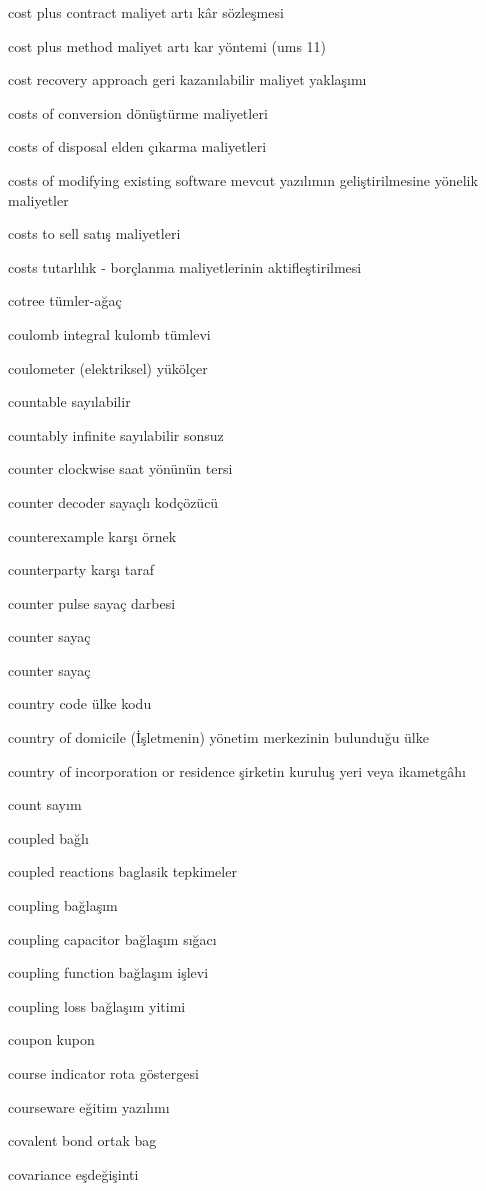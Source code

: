 \documentclass[12pt,fleqn]{article}\usepackage{../../common}
\begin{document}
cost plus contract maliyet artı kâr sözleşmesi

cost plus method maliyet artı kar yöntemi (ums 11)

cost recovery approach geri kazanılabilir maliyet yaklaşımı

costs of conversion dönüştürme maliyetleri

costs of disposal elden çıkarma maliyetleri

costs of modifying existing software mevcut yazılımın geliştirilmesine yönelik maliyetler

costs to sell satış maliyetleri

costs tutarlılık - borçlanma maliyetlerinin aktifleştirilmesi

cotree tümler-ağaç

coulomb integral kulomb tümlevi

coulometer (elektriksel) yükölçer

countable sayılabilir

countably infinite sayılabilir sonsuz

counter clockwise saat yönünün tersi

counter decoder sayaçlı kodçözücü

counterexample karşı örnek

counterparty karşı taraf

counter pulse sayaç darbesi

counter sayaç

counter sayaç

country code ülke kodu

country of domicile (İşletmenin) yönetim merkezinin bulunduğu ülke

country of incorporation or residence şirketin kuruluş yeri veya ikametgâhı

count sayım

coupled bağlı

coupled reactions baglasik tepkimeler

coupling bağlaşım

coupling capacitor bağlaşım sığacı

coupling function bağlaşım işlevi

coupling loss bağlaşım yitimi

coupon kupon

course indicator rota göstergesi

courseware eğitim yazılımı

covalent bond ortak bag

covariance eşdeğişinti
\end{document}
